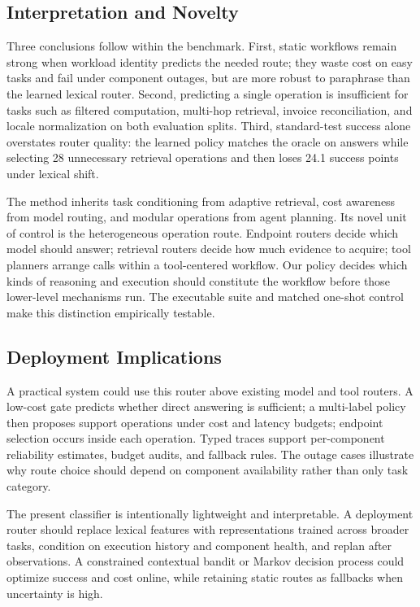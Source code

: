 \documentclass[letterpaper]{article} %
\begin{document}
\subsection{Interpretation and Novelty}

Three conclusions follow within the benchmark. First, static workflows remain strong when workload identity predicts the needed route; they waste cost on easy tasks and fail under component outages, but are more robust to paraphrase than the learned lexical router. Second, predicting a single operation is insufficient for tasks such as filtered computation, multi-hop retrieval, invoice reconciliation, and locale normalization on both evaluation splits. Third, standard-test success alone overstates router quality: the learned policy matches the oracle on answers while selecting 28 unnecessary retrieval operations and then loses 24.1 success points under lexical shift.

The method inherits task conditioning from adaptive retrieval, cost awareness from model routing, and modular operations from agent planning. Its novel unit of control is the heterogeneous operation route. Endpoint routers decide which model should answer; retrieval routers decide how much evidence to acquire; tool planners arrange calls within a tool-centered workflow. Our policy decides which kinds of reasoning and execution should constitute the workflow before those lower-level mechanisms run. The executable suite and matched one-shot control make this distinction empirically testable.

\subsection{Deployment Implications}

A practical system could use this router above existing model and tool routers. A low-cost gate predicts whether direct answering is sufficient; a multi-label policy then proposes support operations under cost and latency budgets; endpoint selection occurs inside each operation. Typed traces support per-component reliability estimates, budget audits, and fallback rules. The outage cases illustrate why route choice should depend on component availability rather than only task category.

The present classifier is intentionally lightweight and interpretable. A deployment router should replace lexical features with representations trained across broader tasks, condition on execution history and component health, and replan after observations. A constrained contextual bandit or Markov decision process could optimize success and cost online, while retaining static routes as fallbacks when uncertainty is high.
\end{document}
